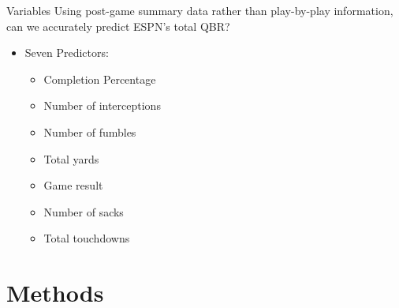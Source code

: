 \documentclass{beamer}
\begin{document}
	\begin{frame}{Variables}
				Using post-game summary data rather than play-by-play information, can we accurately predict ESPN's total QBR?
		\begin{itemize}
			\item Seven Predictors:
			\begin{itemize}
				\item Completion Percentage
				\item Number of interceptions
				\item Number of fumbles
				\item Total yards
				\item Game result
				\item Number of sacks
				\item Total touchdowns
			\end{itemize}
		\end{itemize}
	\end{frame}

	
	\section{Methods}
	
\end{document}
